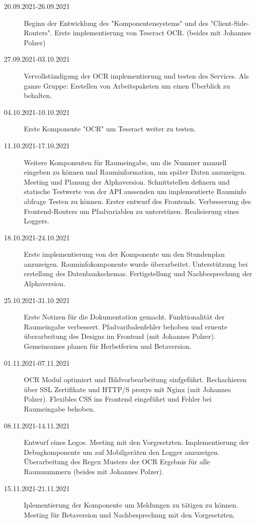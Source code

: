 
\begin{description}
    \item[20.09.2021-26.09.2021]Beginn der Entwicklung des "Komponentensystems" und des "Client-Side-Routers". Erste implementierung von Teseract OCR. (beides mit Johannes Polzer)
    \item[27.09.2021-03.10.2021] Vervollständigung der OCR implementierung und testen des Services. Als ganze Gruppe: Erstellen von Arbeitspaketen um einen Überblick zu behalten.
    \item[04.10.2021-10.10.2021] Erste Komponente "OCR" um Teseract weiter zu testen.
    \item[11.10.2021-17.10.2021] Weitere Komponenten für Raumeingabe, um die Nummer manuell eingeben zu können und Rauminformation, um später Daten anzuzeigen. Meeting und Planung der Alphaversion. Schnittstellen definern und statische Testwerte von der API aussenden um implementierte Rauminfo abfrage Testen zu können. Erster entwurf des Frontends. Verbesserung des Frontend-Routers um Pfadvariablen zu unterstüzen. Realisierung eines Loggers.
    \item[18.10.2021-24.10.2021] Erste implementierung von der Komponente um den Stundenplan anzuzeigen. Rauminfokomponente wurde überarbeitet. Unterstützung bei erstellung des Datenbankschemas. Fertigstellung und Nachbesprechung der Alphaversion.
    \item[25.10.2021-31.10.2021] Erste Notizen für die Dokumentation gemacht. Funktionalität der Raumeingabe verbessert. Pfadvaribalenfehler behoben und erneute überarbeitung des Designs im Frontend (mit Johannes Polzer). Gemeinsames planen für Herbstferien und Betaversion.
    \item[01.11.2021-07.11.2021] OCR Modul optimiert und Bildvorbearbeitung einfgeführt. Rechachieren über SSL Zertifikate und HTTP/S proxys mit Nginx (mit Johannes Polzer). Flexibles CSS ins Frontend eingeführt und Fehler bei Raumeingabe behoben.
    \item[08.11.2021-14.11.2021] Entwurf eines Logos. Meeting mit den Vorgesetzten. Implementierung der Debugkomponente um auf Mobilgeräten den Logger anzuzeigen. Überarbeitung des Regex Musters der OCR Ergebnis für alle Raumnummern (beides mit Johannes Polzer).
    \item[15.11.2021-21.11.2021] Iplementierung der Komponente um Meldungen zu tätigen zu können. Meeting für Betaversion und Nachbesprechung mit den Vorgesetzten. 

\end{description}
